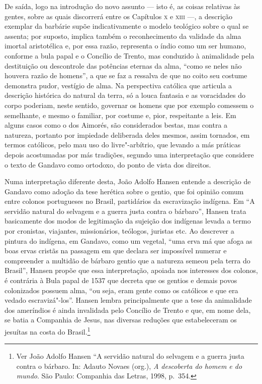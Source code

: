 De saída, logo na introdução do novo assunto --- isto é, as coisas
relativas às gentes, sobre as quais discorrerá entre os Capítulos \textsc{x} e
\textsc{xiii} ---, a descrição exemplar da barbárie supõe indicativamente o modelo
teológico sobre o qual se assenta; por suposto, implica também o
reconhecimento da validade da alma imortal aristotélica e, por essa
razão, representa o índio como um ser humano, conforme a bula papal e o
Concílio de Trento, mas conduzido à animalidade pela destituição ou
descontrole das potências eternas da alma, ``como se neles
não houvera razão de homens'', a que se faz a ressalva de
que no coito seu costume demonstra pudor, vestígio de alma. Na
perspectiva católica que articula a descrição histórica do natural da
terra, só a louca fantasia e as voracidades do corpo poderiam, neste
sentido, governar os homens que por exemplo comessem o semelhante, e
mesmo o familiar, por costume e, pior, respeitante a leis. Em alguns
casos como o dos Aimorés, são considerados bestas, mas contra a
natureza, portanto por impiedade deliberada deles mesmos, assim
tornados, em termos católicos, pelo mau uso do livre"-arbítrio, que
levando a más práticas depois acostumadas por más tradições, segundo
uma interpretação que considere o texto de Gandavo como ortodoxo, do
ponto de vista dos direitos.

Numa interpretação diferente desta, João Adolfo Hansen entende a
descrição de Gandavo como adoção da tese herética sobre o gentio, que
foi opinião comum entre colonos portugueses no Brasil, partidários da
escravização indígena. Em ``A servidão natural do selvagem
e a guerra justa contra o bárbaro'', Hansen trata
basicamente dos modos de legitimação da sujeição dos indígenas levada a
termo por cronistas, viajantes, missionários, teólogos, juristas etc.
Ao descrever a pintura do indígena, em Gandavo, como um vegetal,
``uma erva má que afoga as boas ervas cristãs na passagem
em que declara ser impossível numerar e compreender a multidão de
bárbaro gentio que a natureza semeou pela terra do
Brasil'', Hansen propõe que essa interpretação, apoiada
nos interesses dos colonos, é contrária à Bula papal de 1537 que
decreta que os gentios e demais povos colonizados possuem alma,
``ou seja, eram gente como os católicos e que era vedado
escravizá"-los''. Hansen lembra principalmente que a tese
da animalidade dos ameríndios é ainda invalidada pelo Concílio de
Trento e que, em nome dela, se batia a Companhia de Jesus, nas diversas
reduções que estabeleceram os jesuítas na costa do Brasil.\footnote{ Ver João 
Adolfo Hansen ``A servidão natural do selvagem e
a guerra justa contra o bárbaro. In: Adauto Novaes (org.), \textit{A descoberta
do homem e do mundo}. São Paulo: Companhia das Letras, 1998, p.~354.}

